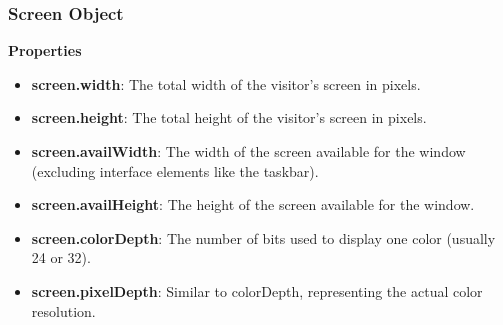 \documentclass{report}
\begin{document}
    \subsubsection{Screen Object}
    \textbf{Properties}
    \begin{itemize}
        \item \textbf{screen.width}: The total width of the visitor’s screen in pixels.
        \item \textbf{screen.height}: The total height of the visitor’s screen in pixels.
        \item \textbf{screen.availWidth}: The width of the screen available for the window (excluding interface elements like the taskbar).
        \item \textbf{screen.availHeight}: The height of the screen available for the window.
        \item \textbf{screen.colorDepth}: The number of bits used to display one color (usually 24 or 32).
        \item \textbf{screen.pixelDepth}: Similar to colorDepth, representing the actual color resolution.
    \end{itemize}




     





















    
\end{document}
